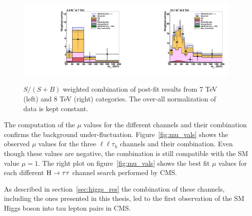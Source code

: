 \begin{figure}
\begin{center}
  \includegraphics[width=0.49\textwidth]{4_Analisys/pics/postfit/postfit_ssb_weight_7TeV.pdf}
  \includegraphics[width=0.49\textwidth]{4_Analisys/pics/postfit/postfit_ssb_weight_8TeV.pdf}\\
  \caption{$S / (S+B)$ weighted combination of post-fit results from 7 TeV (left) and 8 TeV (right) categories. The over-all normalization of data is kept constant.}
  \label{fig:sbweight}
\end{center}
\end{figure}

The computation of the $\mu$ values for the different channels and their combination confirms the background under-fluctuation. Figure~\ref{fig:mu_vals} shows the observed $\mu$ values for the three $\ell\ell\tau_h$ channels and their combination. Even though these values are negative, the combination is still compatible with the SM value $\mu = 1$. The right plot on figure~\ref{fig:mu_vals} shows the best fit $\mu$ values for each different $\mathrm{H}\rightarrow\tau\tau$ channel search performed by CMS.%

As described in section~\ref{sec:higgs_res} the combination of these channels, including the ones presented in this thesis, led to the first observation of the SM Higgs boson into tau lepton pairs in CMS.

